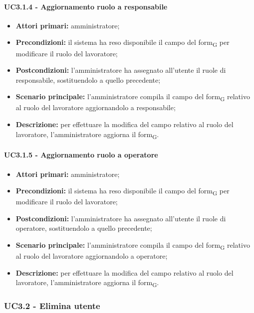 \paragraph{UC3.1.4 - Aggiornamento ruolo a responsabile}

\begin{itemize}
	\item 	\textbf{Attori primari:} amministratore;
	\item 	\textbf{Precondizioni:} il sistema ha reso disponibile il campo del form\textsubscript{G} per modificare il ruolo del lavoratore;
	\item 	\textbf{Postcondizioni:} l'amministratore ha assegnato all'utente il ruole di responsabile, sostituendolo a quello precedente;
	\item 	\textbf{Scenario principale:} l'amministratore compila il campo del form\textsubscript{G} relativo al ruolo del lavoratore aggiornandolo a responsabile;
	\item 	\textbf{Descrizione:} per effettuare la modifica del campo relativo al ruolo del lavoratore, l'amministratore aggiorna il form\textsubscript{G}.

\end{itemize}

\paragraph{UC3.1.5 - Aggiornamento ruolo a operatore}

\begin{itemize}
	\item 	\textbf{Attori primari:} amministratore;
	\item 	\textbf{Precondizioni:} il sistema ha reso disponibile il campo del form\textsubscript{G} per modificare il ruolo del lavoratore;
	\item 	\textbf{Postcondizioni:} l'amministratore ha assegnato all'utente il ruole di operatore, sostituendolo a quello precedente;
	\item 	\textbf{Scenario principale:} l'amministratore compila il campo del form\textsubscript{G} relativo al ruolo del lavoratore aggiornandolo a operatore;
	\item 	\textbf{Descrizione:} per effettuare la modifica del campo relativo al ruolo del lavoratore, l'amministratore aggiorna il form\textsubscript{G}.

\end{itemize}

\subsubsection{UC3.2 - Elimina utente}

